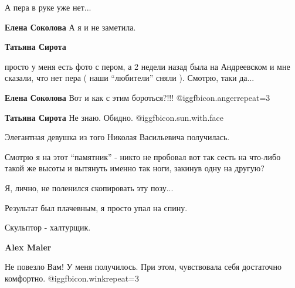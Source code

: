  
 
 
 
 



А пера в руке уже нет...

\textbf{Елена Соколова} А я и не заметила.

\textbf{Татьяна Сирота} 

просто у меня есть фото с пером, а 2 недели назад была на Андреевском и мне
сказали, что нет пера ( наши \enquote{любители} сняли ). Смотрю, таки да...


\textbf{Елена Соколова} Вот и как с этим бороться?!!! @igg{fbicon.anger}{repeat=3} 

\textbf{Татьяна Сирота} Не знаю. Обидно. @igg{fbicon.sun.with.face} 

Элегантная девушка из того Николая Васильевича получилась.


Смотрю я на этот \enquote{памятник} - никто не пробовал вот так сесть на что-либо такой
же высоты и вытянуть именно так ноги, закинув одну на другую?

Я, лично, не поленился скопировать эту позу...

Результат был плачевным, я просто упал на спину.

Скульптор - халтурщик.

\textbf{Alex Maler} 

Не повезло Вам! У меня получилось. При этом, чувствовала себя достаточно
комфортно. @igg{fbicon.wink}{repeat=3} 
